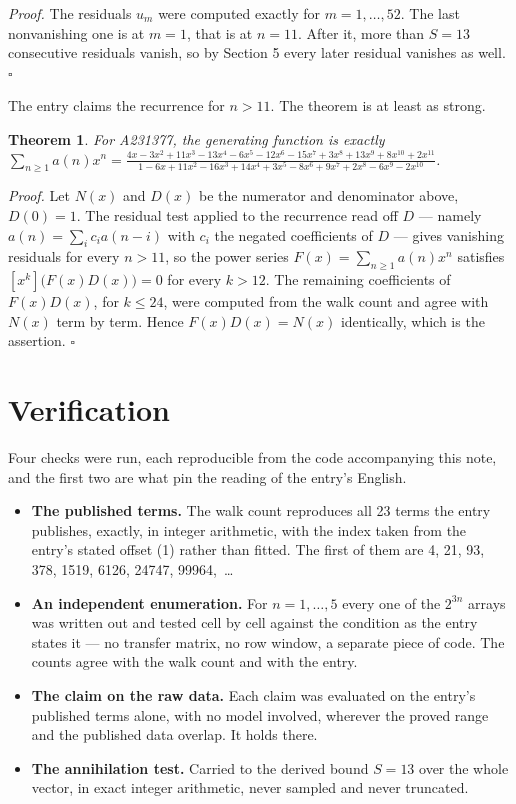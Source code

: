 \documentclass[11pt]{article}
\newtheorem{theorem}{Theorem}
\theoremstyle{definition}
\begin{document}
{\itshape Proof.} The residuals $u_m$ were computed exactly for $m = 1,\dots,52$. The last nonvanishing one is at $m = 1$, that is at $n = 11$. After it, more than $S = 13$ consecutive residuals vanish, so by Section 5 every later residual vanishes as well. $\square$

The entry claims the recurrence for $n > 11$. The theorem is at least as strong.

\begin{theorem} For A231377, the generating function is exactly $\sum_{n\ge 1} a(n)x^n = \frac{4x - 3x^{2} + 11x^{3} - 13x^{4} - 6x^{5} - 12x^{6} - 15x^{7} + 3x^{8} + 13x^{9} + 8x^{10} + 2x^{11}}{1 - 6x + 11x^{2} - 16x^{3} + 14x^{4} + 3x^{5} - 8x^{6} + 9x^{7} + 2x^{8} - 6x^{9} - 2x^{10}}$.\end{theorem}

{\itshape Proof.} Let $N(x)$ and $D(x)$ be the numerator and denominator above, $D(0)=1$. The residual test applied to the recurrence read off $D$ --- namely $a(n) = \sum_i c_i a(n-i)$ with $c_i$ the negated coefficients of $D$ --- gives vanishing residuals for every $n > 11$, so the power series $F(x)=\sum_{n\ge 1}a(n)x^n$ satisfies $[x^k]\bigl(F(x)D(x)\bigr) = 0$ for every $k > 12$. The remaining coefficients of $F(x)D(x)$, for $k \le 24$, were computed from the walk count and agree with $N(x)$ term by term. Hence $F(x)D(x) = N(x)$ identically, which is the assertion. $\square$

\section{Verification}

Four checks were run, each reproducible from the code accompanying this note, and the first two are what pin the reading of the entry's English.

\begin{itemize}

\item {\bfseries The published terms.} The walk count reproduces all 23 terms the entry publishes, exactly, in integer arithmetic, with the index taken from the entry's stated offset (1) rather than fitted. The first of them are 4, 21, 93, 378, 1519, 6126, 24747, 99964,~\dots

\item {\bfseries An independent enumeration.} For $n = 1,\dots,5$ every one of the $2^{3n}$ arrays was written out and tested cell by cell against the condition as the entry states it --- no transfer matrix, no row window, a separate piece of code. The counts agree with the walk count and with the entry.

\item {\bfseries The claim on the raw data.} Each claim was evaluated on the entry's published terms alone, with no model involved, wherever the proved range and the published data overlap. It holds there.

\item {\bfseries The annihilation test.} Carried to the derived bound $S = 13$ over the whole vector, in exact integer arithmetic, never sampled and never truncated.

\end{itemize}
\end{document}
